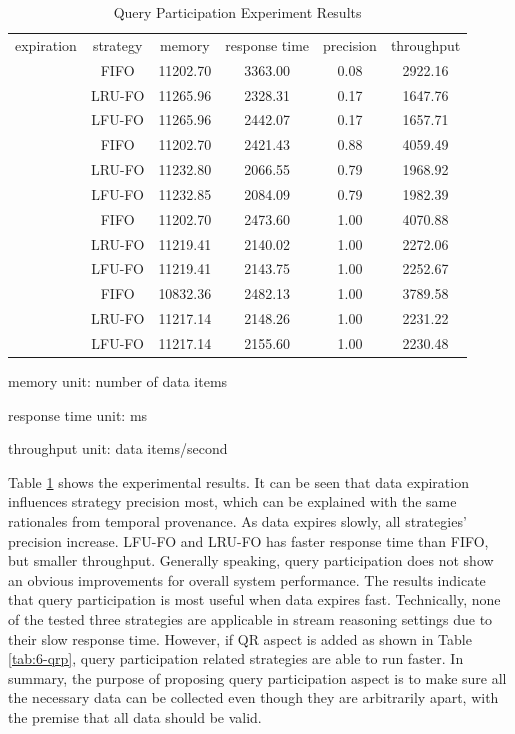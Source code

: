 \begin{table}[!htbp]
	\centering
    \caption{Query Participation Experiment Results}
    \label{tab:6-qpp}
    \begin{tabular}{|c||c||c|c|c|c|} \hline
    expiration & strategy & memory & response time & precision & throughput \\ \hhline{|=#=#=|=|=|=|}
    \multirow{3}{*}{quick} & FIFO   & 11202.70 & 3363.00 & 0.08 & 2922.16 \\ \cline{2-6} 
 					      & LRU-FO & 11265.96 & 2328.31 & 0.17 & 1647.76 \\ \cline{2-6} 
 					      & LFU-FO & 11265.96 & 2442.07 & 0.17 & 1657.71 \\ \hhline{|=#=#=|=|=|=|}
	\multirow{3}{*}{normal} & FIFO   & 11202.70 & 2421.43 & 0.88 & 4059.49 \\ \cline{2-6} 
 						    & LRU-FO & 11232.80 & 2066.55 & 0.79 & 1968.92 \\ \cline{2-6} 
 						    & LFU-FO & 11232.85 & 2084.09 & 0.79 & 1982.39 \\ \hhline{|=#=#=|=|=|=|}
	\multirow{3}{*}{slow} & FIFO & 11202.70   & 2473.60 & 1.00 & 4070.88 \\ \cline{2-6} 
					      & LRU-FO & 11219.41 & 2140.02 & 1.00 & 2272.06 \\ \cline{2-6} 
 					      & LFU-FO & 11219.41 & 2143.75 & 1.00 & 2252.67 \\ \hhline{|=#=#=|=|=|=|}
    \multirow{3}{*}{none} & FIFO & 10832.36 & 2482.13 & 1.00 & 3789.58 \\ \cline{2-6}
    					  & LRU-FO & 11217.14 & 2148.26 & 1.00 & 2231.22 \\ \cline{2-6}
                          & LFU-FO & 11217.14 & 2155.60 & 1.00 & 2230.48 \\ \hline
	\end{tabular}
    \begin{tablenotes}
 		\item memory unit: number of data items
 		\item response time unit: ms
 		\item throughput unit: data items/second
    \end{tablenotes}
\end{table}

Table \ref{tab:6-qpp} shows the experimental results. 
It can be seen that data expiration influences strategy precision most, which can be explained with the same rationales from temporal provenance. 
As data expires slowly, all strategies' precision increase. 
LFU-FO and LRU-FO has faster response time than FIFO, but smaller throughput. 
Generally speaking, query participation does not show an obvious improvements for overall system performance.
The results indicate that query participation is most useful when data expires fast.
Technically, none of the tested three strategies are applicable in stream reasoning settings due to their slow response time. 
However, if QR aspect is added as shown in Table \ref{tab:6-qrp}, query participation related strategies are able to run faster. 
In summary, the purpose of proposing query participation aspect is to make sure all the necessary data can be collected even though they are arbitrarily apart, with the premise that all data should be valid.
%
